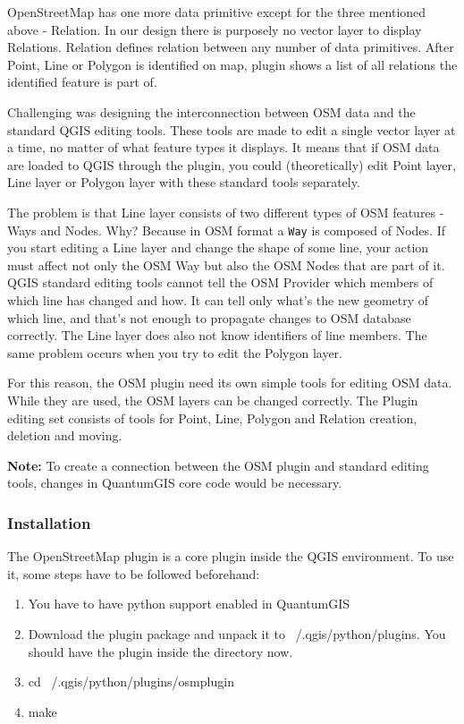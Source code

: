 OpenStreetMap has one more data primitive except for the three mentioned
above - Relation. In our design there is purposely no vector layer to display
Relations. Relation defines relation between any number of data primitives.
After Point, Line or Polygon is identified on map, plugin shows a list of all
relations the identified feature is part of.

Challenging was designing the interconnection between OSM data and the 
standard QGIS editing tools. These tools are made to edit a single vector 
layer at a time, no matter of what feature types it displays. It means 
that if OSM data are loaded to QGIS through the plugin, you could 
(theoretically) edit Point layer, Line layer or Polygon layer with these 
standard tools separately.

The problem is that Line layer consists of two different types of OSM
features - Ways and Nodes. Why? Because in OSM format a \texttt{Way} is 
composed of Nodes. If you start editing a Line layer and change the 
shape of some line, your action must affect not only the OSM Way but 
also the OSM Nodes that are part of it. \\
QGIS standard editing tools cannot tell the OSM Provider which members
of which line has changed and how. It can tell only what's the new geometry
of which line, and that's not enough to propagate changes to OSM database
correctly. The Line layer does also not know identifiers of line members.
The same problem occurs when you try to edit the Polygon layer.

For this reason, the OSM plugin need its own simple tools for editing 
OSM data. While they are used, the OSM layers can be changed correctly. 
The Plugin editing set consists of tools for Point, Line, Polygon and 
Relation creation, deletion and moving.

\textbf{Note:} To create a connection between the OSM plugin and standard 
editing tools, changes in QuantumGIS core code would be necessary.

\subsubsection{Installation}

The OpenStreetMap plugin is a core plugin inside the QGIS environment. To 
use it, some steps have to be followed beforehand:

\begin{enumerate}
\item You have to have python support enabled in QuantumGIS
\item Download the plugin package and unpack it to ~/.qgis/python/plugins.
You should have the plugin inside the directory now. 
\item cd ~/.qgis/python/plugins/osmplugin 
\item make 
\end{enumerate}

